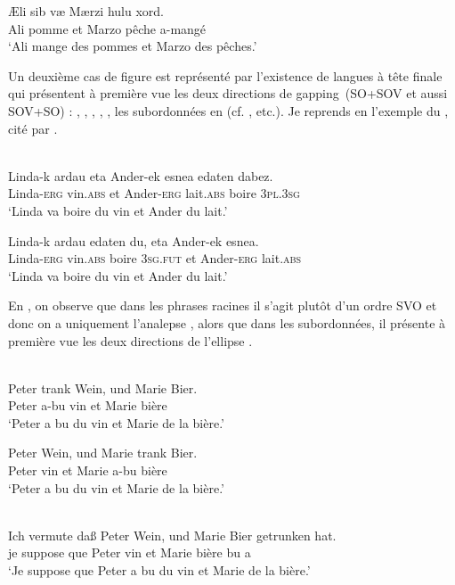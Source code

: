 \ex 
\gll *Æli sib væ Mærzi hulu xord.\\
Ali pomme et Marzo pêche a-mangé\\
\glt ‘Ali mange des pommes et Marzo des pêches.’
\z
\z

Un deuxième cas de figure est représenté par l’existence de langues à tête finale qui présentent à première vue les deux directions de gapping~(SO+SOV et aussi SOV+SO) : , , , , , les subordonnées en  (cf. \citealt{Maling1972,MallinsonEtAl1981,Kazenin2001,Hernandez2007,Haspelmath2007}, etc.). Je reprends en  l’exemple du , cité par \citet{Haspelmath2007}.

\ea \label{ch2:ex9}
\\
\ea
\gll Linda-k ardau eta Ander-ek esnea edaten dabez. \label{ch2:ex9a}\\
Linda-\textsc{erg} vin.\textsc{abs} et Ander-\textsc{erg} lait.\textsc{abs} boire \textsc{3pl.3sg}\\
\glt ‘Linda va boire du vin et Ander du lait.’

\ex 
\gll Linda-k ardau edaten du, eta Ander-ek esnea. \label{ch2:ex9b}\\
Linda-\textsc{erg} vin.\textsc{abs} boire \textsc{3sg.fut} et Ander-\textsc{erg} lait.\textsc{abs}\\
\glt ‘Linda va boire du vin et Ander du lait.’  
\z
\z

En , on observe que dans les phrases racines il s’agit plutôt d’un ordre SVO et donc on a uniquement l’analepse , alors que dans les subordonnées, il présente à première vue les deux directions de l’ellipse .

\ea \label{ch2:ex10}
\\
\ea 
\gll Peter trank Wein, und Marie Bier.\\
Peter a-bu vin et Marie bière\\
\glt ‘Peter a bu du vin et Marie de la bière.’      

\ex 
\gll *Peter Wein, und Marie trank Bier.\\
Peter vin et Marie a-bu bière\\
\glt ‘Peter a bu du vin et Marie de la bière.’
\z
\z

\ea \label{ch2:ex11}
\\
\ea 
\gll Ich vermute daß Peter Wein, und Marie Bier getrunken hat.\\
je suppose que Peter vin et Marie bière bu a\\
\glt ‘Je suppose que Peter a bu du vin et Marie de la bière.’      

